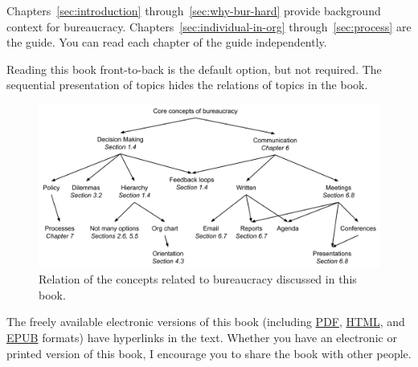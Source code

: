 Chapters~\ref{sec:introduction} %
through~\ref{sec:why-bur-hard} %
provide background context for bureaucracy. 
Chapters~\ref{sec:individual-in-org} %
through~\ref{sec:process} %
are the guide. 
You can read each chapter of the guide independently. 

Reading this book front-to-back is the default option, but not required. The sequential presentation of topics hides the relations of topics in the book. %

\begin{figure}[ht]
    \centering
    \includegraphics[width=1\textwidth]{images/core_concepts_map.pdf}
    \caption{Relation of the concepts related to bureaucracy discussed in this book.}
    \label{fig:core-concepts}
\end{figure}



The freely available electronic versions of this book (including 
\iftoggle{WPinmargin}{\marginpar{$>$Wikipedia: PDF}}{}
\href{https://en.wikipedia.org/wiki/PDF}{PDF}, 
\href{https://en.wikipedia.org/wiki/HTML}{HTML}, and 
\href{https://en.wikipedia.org/wiki/EPUB}{EPUB} 
formats) have hyperlinks in the text. 
\iftoggle{printedonpaper}{}{Light-blue hyperlinks reference external resources like Wikipedia, while dark-blue links reference material within the guide such as the glossary.} Whether you have an electronic or printed version of this book, I encourage you to share the book with other people.


